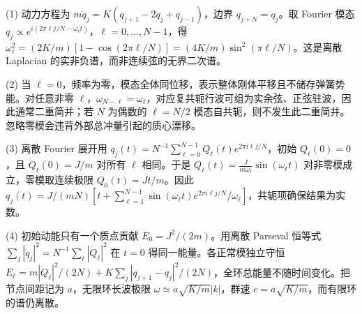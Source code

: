 (1) 动力方程为 \(m\ddot q_j=K(q_{j+1}-2q_j+q_{j-1})\)，边界 \(q_{j+N}=q_j\)。取 Fourier 模态 \(q_j\propto e^{i(2\pi \ell j/N-\omega_\ell t)}\)，\(\ell=0,\dots,N-1\)，得 \(\omega_\ell^2=(2K/m)[1-\cos(2\pi\ell/N)]=(4K/m)\sin^2(\pi\ell/N)\)。这是离散 Laplacian 的实非负谱，而非连续弦的无界二次谱。

(2) 当 \(\ell=0\)，频率为零，模态全体同位移，表示整体刚体平移且不储存弹簧势能。对任意非零 \(\ell\)，\(\omega_{N-\ell}=\omega_\ell\)，对应复共轭行波可组为实余弦、正弦驻波，因此通常二重简并；若 \(N\) 为偶数的 \(\ell=N/2\) 模态自共轭，则不发生此二重简并。忽略零模会违背外部总冲量引起的质心漂移。

(3) 离散 Fourier 展开用 \(q_j(t)=N^{-1}\sum_{\ell=0}^{N-1}Q_\ell(t)e^{2\pi i\ell j/N}\)，初始 \(Q_\ell(0)=0\)，且 \(\dot Q_\ell(0)=J/m\) 对所有 \(\ell\) 相同。于是 \(Q_\ell(t)=\frac{J}{m\omega_\ell}\sin(\omega_\ell t)\) 对非零模成立，零模取连续极限 \(Q_0(t)=Jt/m\)。因此 \(q_j(t)=J/(mN)[t+\sum_{\ell=1}^{N-1}\sin(\omega_\ell t)e^{2\pi i\ell j/N}/\omega_\ell]\)，共轭项确保结果为实数。

(4) 初始动能只有一个质点贡献 \(E_0=J^2/(2m)\)。用离散 Parseval 恒等式 \(\sum_j|\dot q_j|^2=N^{-1}\sum_\ell|\dot Q_\ell|^2\) 在 \(t=0\) 得同一能量。各正常模独立守恒 \(E_\ell=m|\dot Q_\ell|^2/(2N)+K\sum_j|q_{j+1}-q_j|^2/(2N)\)，全环总能量不随时间变化。把节点间距记为 \(a\)，无限环长波极限 \(\omega\simeq a\sqrt{K/m}|k|\)，群速 \(c=a\sqrt{K/m}\)，而有限环的谱仍离散。
